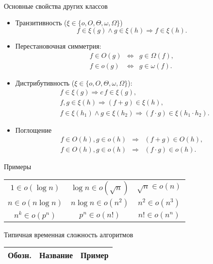\documentclass[landscape]{slides}
\begin{document}
\begin{slide}
  Основные свойства других классов
  \begin{itemize}
    \item Транзитивность ($\xi\in\{o,O,\Theta,\omega,\Omega\}$)
      \[
        f\in \xi(g) \land g\in \xi(h) \Rightarrow f\in \xi(h) .
      \]
    \item Перестановочная симметрия:
      \begin{eqnarray*}
        f\in O(g) &\Leftrightarrow& g\in \Omega(f),\\
        f\in o(g) &\Leftrightarrow& g\in \omega(f).
      \end{eqnarray*}
    \item Дистрибутивность ($\xi\in\{o,O,\Theta,\omega,\Omega\}$):
      \begin{eqnarray*}
        &f\in \xi(g) \Rightarrow c\,f\in \xi(g),\\
        &f, g\in\xi(h) \Rightarrow (f+g)\in\xi(h),\\
        &f\in\xi(h_1) \land g\in\xi(h_2) \Rightarrow (f\cdot g)\in\xi(h_1\cdot h_2).
      \end{eqnarray*}
    \item Поглощение
      \begin{eqnarray*}
        f\in O(h), g\in o(h) &\Rightarrow& (f+g)\in O(h),\\
        f\in O(h), g\in o(h) &\Rightarrow& (f\cdot g)\in o(h).
      \end{eqnarray*}
  \end{itemize}
\end{slide}

\begin{slide}
  Примеры
  \begin{center}
    \begin{tabular}{ccc}
      $1 \in o(\log n)$&
      $\log n\in o(\sqrt{n})$&
      $\sqrt{n}\in o(n)$\\[1ex]
      $n\in o(n\log n)$&
      $n\log n\in o(n^2)$&
      $n^2\in o(n^3)$\\[1ex]
      $n^k\in o(p^n)$&
      $p^n\in o(n!)$&
      $n!\in o(n^n)$
    \end{tabular}
  \end{center}
\end{slide}

\begin{slide}
  Типичная временная сложность алгоритмов
  \begin{center}
    \begin{tabular}{|l|l|l|}
      \hline
      Обозн.&
      Название&
      Пример
      \\
      \hline
    \end{tabular}
  \end{center}
\end{slide}
\end{document}
